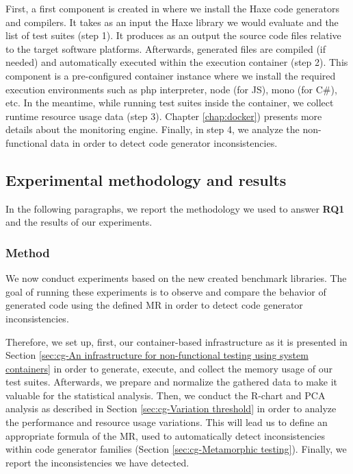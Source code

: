 First, a first component is created in where we install the Haxe code generators and compilers. It takes as an input the Haxe library we would evaluate and the list of test suites (step 1). It produces as an output the source code files relative to the target software platforms. Afterwards, generated files are compiled (if needed) and automatically executed within the execution container (step 2). This component is a pre-configured container instance where we install the required execution environments such as php interpreter, node (for JS), mono (for C\#), etc. 
In the meantime, while running test suites inside the container, we collect runtime resource usage data (step 3). Chapter \ref{chap:docker}) presents more details about the monitoring engine.
Finally, in step 4, we analyze the non-functional data in order to detect code generator inconsistencies.

\subsection{Experimental methodology and results}
In the following paragraphs, we report the methodology we used to answer \textbf{RQ1} and the results of our experiments. 

\subsubsection{Method}
We now conduct experiments based on the new created benchmark libraries. 
The goal of running these experiments is to observe and compare the behavior of generated code using the defined MR in order to detect code generator inconsistencies.

Therefore, we set up, first, our container-based infrastructure as it is presented in Section \ref{sec:cg-An infrastructure for non-functional testing using system containers} in order to generate, execute, and collect the memory usage of our test suites.
Afterwards, we prepare and normalize the gathered data to make it valuable for the statistical analysis. Then, we conduct the R-chart and PCA analysis as described in Section \ref{sec:cg-Variation threshold} in order to analyze the performance and resource usage variations. This will lead us to define an appropriate formula of the MR, used to automatically detect inconsistencies within code generator families (Section \ref{sec:cg-Metamorphic testing}). Finally, we report the inconsistencies we have detected.



